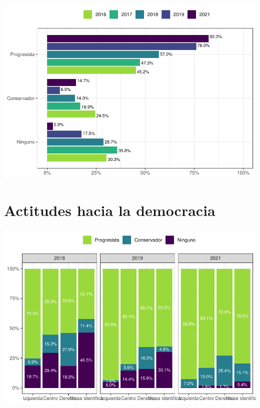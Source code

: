 \documentclass[
  12pt,
]{book}
\begin{document}
\begin{center}\includegraphics{reporte-elsoc_files/figure-latex/unnamed-chunk-9-1} \end{center}

\hypertarget{actitudes-hacia-la-democracia}{%
\section{Actitudes hacia la democracia}\label{actitudes-hacia-la-democracia}}

\begin{center}\includegraphics{reporte-elsoc_files/figure-latex/unnamed-chunk-10-1} \end{center}
\end{document}
